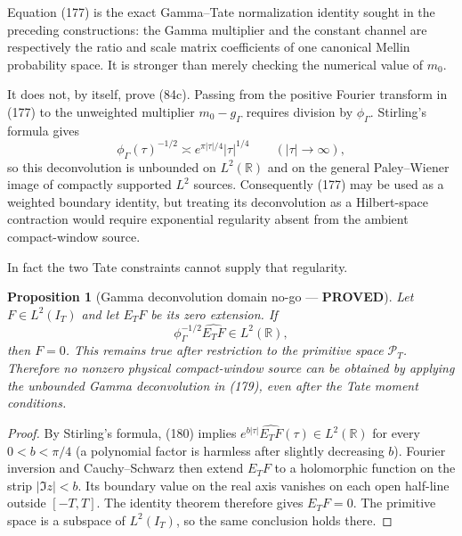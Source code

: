 \documentclass[11pt]{article}
\newtheorem{proposition}[theorem]{Proposition}
\newcommand{\PROVED}{\textcolor{green!45!black}{\textbf{PROVED}}}
\begin{document}
Equation (177) is the exact Gamma--Tate normalization identity sought in
the preceding constructions: the Gamma multiplier and the constant channel
are respectively the ratio and scale matrix coefficients of one canonical
Mellin probability space.  It is stronger than merely checking the numerical
value of $m_0$.

It does not, by itself, prove (84c).  Passing from the positive Fourier
transform in (177) to the unweighted multiplier $m_0-g_\Gamma$ requires
division by $\phi_\Gamma$.  Stirling's formula gives
\begin{equation}
 \phi_\Gamma(\tau)^{-1/2}
 \asymp e^{\pi|\tau|/4}|\tau|^{1/4}
 \qquad(|\tau|\to\infty),                            \tag{179}
\end{equation}
so this deconvolution is unbounded on $L^2(\mathbb R)$ and on the general
Paley--Wiener image of compactly supported $L^2$ sources.  Consequently
(177) may be used as a weighted boundary identity, but treating its
deconvolution as a Hilbert-space contraction would require exponential
regularity absent from the ambient compact-window source.

In fact the two Tate constraints cannot supply that regularity.

\begin{proposition}[Gamma deconvolution domain no-go --- \PROVED]
Let $F\in L^2(I_T)$ and let $E_TF$ be its zero extension.  If
\begin{equation}
 \phi_\Gamma^{-1/2}\widehat{E_TF}\in L^2(\mathbb R), \tag{180}
\end{equation}
then $F=0$.  This remains true after restriction to the primitive space
$\mathcal P_T$.  Therefore no nonzero physical compact-window source can be
obtained by applying the unbounded Gamma deconvolution in (179), even after
the Tate moment conditions.
\end{proposition}

\begin{proof}
By Stirling's formula, (180) implies
$e^{b|\tau|}\widehat{E_TF}(\tau)\in L^2(\mathbb R)$ for every
$0<b<\pi/4$ (a polynomial factor is harmless after slightly decreasing
$b$).  Fourier inversion and Cauchy--Schwarz then extend $E_TF$ to a
holomorphic function on the strip $|\Im z|<b$.  Its boundary value on the
real axis vanishes on each open half-line outside $[-T,T]$.  The identity
theorem therefore gives $E_TF=0$.  The primitive space is a subspace of
$L^2(I_T)$, so the same conclusion holds there.
\end{proof}
\end{document}
